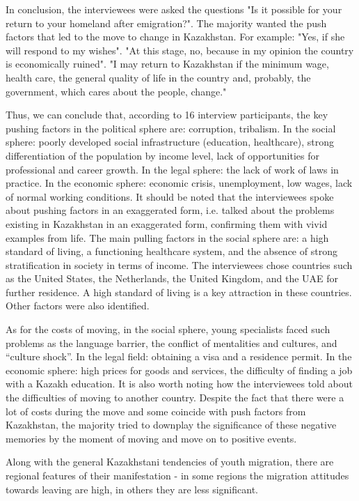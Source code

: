 \begin{multicols}{2}
In conclusion, the interviewees were asked the questions "Is it possible
for your return to your homeland after emigration?". The majority wanted
the push factors that led to the move to change in Kazakhstan. For
example: "Yes, if she will respond to my wishes". "At this stage, no,
because in my opinion the country is economically ruined". "I may return
to Kazakhstan if the minimum wage, health care, the general quality of
life in the country and, probably, the government, which cares about the
people, change."

Thus, we can conclude that, according to 16 interview participants, the
key pushing factors in the political sphere are: corruption, tribalism.
In the social sphere: poorly developed social infrastructure (education,
healthcare), strong differentiation of the population by income level,
lack of opportunities for professional and career growth. In the legal
sphere: the lack of work of laws in practice. In the economic sphere:
economic crisis, unemployment, low wages, lack of normal working
conditions. It should be noted that the interviewees spoke about pushing
factors in an exaggerated form, i.e. talked about the problems existing
in Kazakhstan in an exaggerated form, confirming them with vivid
examples from life. The main pulling factors in the social sphere are: a
high standard of living, a functioning healthcare system, and the
absence of strong stratification in society in terms of income. The
interviewees chose countries such as the United States, the Netherlands,
the United Kingdom, and the UAE for further residence. A high standard
of living is a key attraction in these countries. Other factors were
also identified.

As for the costs of moving, in the social sphere, young specialists
faced such problems as the language barrier, the conflict of mentalities
and cultures, and ``culture shock''. In the legal field: obtaining a
visa and a residence permit. In the economic sphere: high prices for
goods and services, the difficulty of finding a job with a Kazakh
education. It is also worth noting how the interviewees told about the
difficulties of moving to another country. Despite the fact that there
were a lot of costs during the move and some coincide with push factors
from Kazakhstan, the majority tried to downplay the significance of
these negative memories by the moment of moving and move on to positive
events.

Along with the general Kazakhstani tendencies of youth migration, there
are regional features of their manifestation - in some regions the
migration attitudes towards leaving are high, in others they are less
significant.


\end{multicols}
